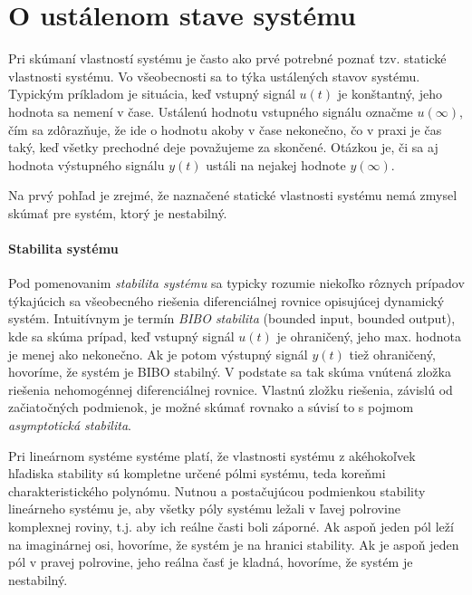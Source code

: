 \documentclass[a4paper, 10pt, ]{article}
\begin{document}
\section{O ustálenom stave systému}

Pri skúmaní vlastností systému je často ako prvé potrebné poznať tzv. statické vlastnosti systému. Vo všeobecnosti sa to týka ustálených stavov systému. Typickým príkladom je situácia, keď vstupný signál $u(t)$ je konštantný, jeho hodnota sa nemení v čase. Ustálenú hodnotu vstupného signálu označme $u(\infty)$, čím sa zdôrazňuje, že ide o hodnotu akoby v čase nekonečno, čo v praxi je čas taký, keď všetky prechodné deje považujeme za skončené. Otázkou je, či sa aj hodnota výstupného signálu $y(t)$ ustáli na nejakej hodnote $y(\infty)$. 

Na prvý pohľad je zrejmé, že naznačené statické vlastnosti systému nemá zmysel skúmať pre systém, ktorý je nestabilný.



\paragraph{Stabilita systému}

Pod pomenovanim \emph{stabilita systému} sa typicky rozumie niekoľko rôznych prípadov týkajúcich sa všeobecného riešenia diferenciálnej rovnice opisujúcej dynamický systém. Intuitívnym je termín \emph{BIBO stabilita} (bounded input, bounded output), kde sa skúma prípad, keď vstupný signál $u(t)$ je ohraničený, jeho max. hodnota je menej ako nekonečno. Ak je potom výstupný signál $y(t)$ tiež ohraničený, hovoríme, že systém je BIBO stabilný. V podstate sa tak skúma vnútená zložka riešenia nehomogénnej diferenciálnej rovnice. Vlastnú zložku riešenia, závislú od začiatočných podmienok, je možné skúmať rovnako a súvisí to s pojmom \emph{asymptotická stabilita}. 

\smallskip

Pri lineárnom systéme systéme platí, že vlastnosti systému z akéhokoľvek hľadiska stability sú kompletne určené pólmi systému, teda koreňmi charakteristického polynómu. Nutnou a postačujúcou podmienkou stability lineárneho systému je, aby všetky póly systému ležali v ľavej polrovine komplexnej roviny, t.j. aby ich reálne časti boli záporné. Ak aspoň jeden pól leží na imaginárnej osi, hovoríme, že systém je na hranici stability. Ak je aspoň jeden pól v pravej polrovine, jeho reálna časť je kladná, hovoríme, že systém je nestabilný.
\end{document}
